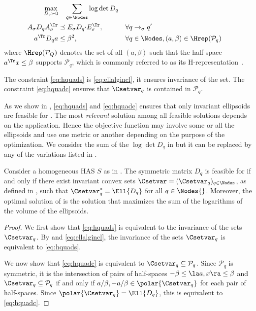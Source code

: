 \documentclass[11pt,twoside,a4paper,openright]{uclouvain-thesis}
\newcommand{\tr}{\to}
\newcommand{\trs}[1][\sigma]{\tr_{#1}}
\newcommand{\Ps}{\mathcal{P}}
\newcommand{\sys}{S}
\newcommand{\dtahas}{HAS}
\begin{document}
\begin{myprog}
  \label{prog:hquad}
  \begin{align}
    \notag
    \max_{D_q \succ 0}
    & \quad \sum_{q \in \Nodes} \log \det D_q\\
      \label{eq:hquads}
      A_\sigma D_q A_\sigma^\Tr & \preceq E_\sigma D_{q'} E_\sigma^\Tr,
      && \forall q \trs q'\\
      \label{eq:hquadc}
      a^\Tr D_q a & \leq \beta^2,
      && \forall q \in \Nodes, (a, \beta) \in \Hrep(\Ps_q)
  \end{align}
  where $\Hrep(\Ps_Q)$ denotes the set of all $(a, \beta)$ such that the half-space $a^\Tr x \leq \beta$ supports $\Ps_q$,
  which is commonly referred to as its H-representation~\cite{ziegler1995lectures}.
\end{myprog}

The constraint \eqref{eq:hquads} is \eqref{eq:ellalgincl}, it ensures invariance of the set.
The constraint \eqref{eq:hquadc} ensures that $\Csetvar_q$ is contained in $\Ps_q$.

\begin{myrem}
  \label{rem:obj}
  As we show in , \eqref{eq:hquads} and \eqref{eq:hquadc} ensures
  that only invariant ellipsoids are feasible for .
  The most \emph{relevant} solution among all feasible solutions depends on the application.
  Hence the objective function may involve some or all the ellipsoids and use
  one metric or another depending on the purpose of the optimization.
  We consider the sum of the $\log \det D_q$ in  but it can be
  replaced by any of the variations listed in .
\end{myrem}


\begin{mytheo}
  \label{theo:hquad}
  Consider a homogeneous \dtahas{} $\sys$ as in .
  The symmetric matrix $D_q$ is feasible for  if and only if
  there exist invariant convex sets $\Csetvar = (\Csetvar_q)_{q \in \Nodes}$,
  as defined in ,
  such that $\Csetvar_q^\circ = \Ell{D_q}$ for all $q \in \Nodes{}$.
  Moreover, the optimal solution of  is the solution that maximizes
  the sum of the logarithms of the volume of the ellipsoids.
  \begin{proof}
    We first show that \eqref{eq:hquads} is equivalent to the invariance of the sets $\Csetvar_q$.
    By  and \eqref{eq:ellalgincl}, the invariance of the sets $\Csetvar_q$ is equivalent to \eqref{eq:hquads}.

    We now show that \eqref{eq:hquadc} is equivalent to $\Csetvar_q \subseteq \Ps_q$.
    Since $\Ps_q$ is symmetric,
    it is the intersection of pairs of half-spaces $-\beta \leq \la a, x \ra \leq \beta$ and
    $\Csetvar_q \subseteq \Ps_q$ if and only if $a/\beta, -a/\beta \in \polar{\Csetvar_q}$ for each pair of half-spaces.
    Since $\polar{\Csetvar_q} = \Ell{D_q}$, this is equivalent to \eqref{eq:hquadc}.
  \end{proof}
\end{mytheo}
\end{document}
